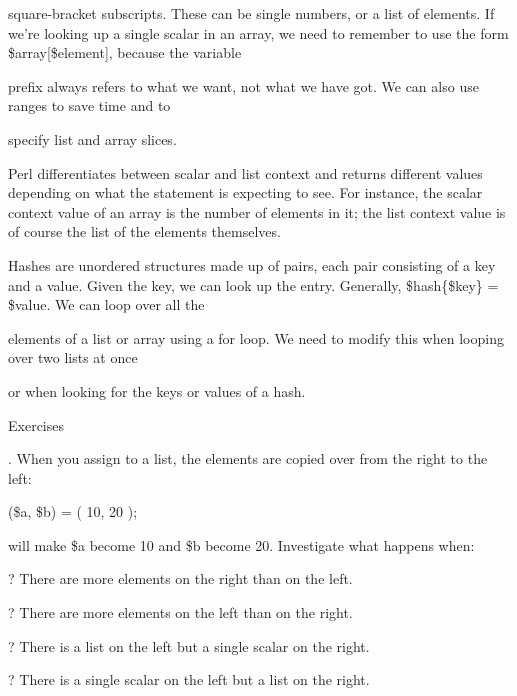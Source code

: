 \documentclass[a4paper,11pt]{book}
\begin{document}
\noindent square-bracket subscripts. These can be single numbers, or a list of elements. If we're looking up a single scalar in an array, we need to remember to use the form \$array[\$element], because the variable

\noindent prefix always refers to what we want, not what we have got. We can also use ranges to save time and to

\noindent specify list and array slices.

\noindent 

\noindent Perl differentiates between scalar and list context and returns different values depending on what the statement is expecting to see. For instance, the scalar context value of an array is the number of elements in it; the list context value is of course the list of the elements themselves.

\noindent 

\noindent Hashes are unordered structures made up of pairs, each pair consisting of a key and a value. Given the key, we can look up the entry. Generally, \$hash\{\$key\} = \$value. We can loop over all the

\noindent elements of a list or array using a for loop. We need to modify this when looping over two lists at once

\noindent or when looking for the keys or values of a hash.

\noindent 

\noindent 

\noindent Exercises

\noindent 

.   When you assign to a list, the elements are copied over from the right to the left:

\noindent 

\noindent (\$a, \$b) = ( 10, 20 );

\noindent 

\noindent will make \$a become 10 and \$b become 20. Investigate what happens when:

\noindent 

\noindent ? There are more elements on the right than on the left.

\noindent ? There are more elements on the left than on the right.

\noindent ? There is a list on the left but a single scalar on the right.

\noindent ? There is a single scalar on the left but a list on the right.
\end{document}

